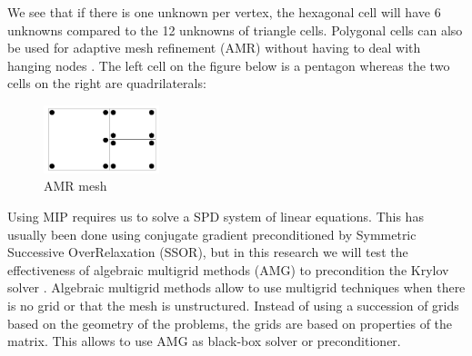 We see that if there is one unknown per vertex, the hexagonal cell will have 6
unknowns compared to the 12 unknowns of triangle cells. Polygonal cells can
also be used for adaptive mesh refinement (AMR) without having to
deal with hanging nodes 
\cite{locally_hanging_nodes,arbitrary_hanging_nodes,dealII_hanging_nodes}. The 
left cell on the figure below is a pentagon whereas the two cells on the right 
are quadrilaterals:
\begin{figure}[H]
\centering
\includegraphics[width=0.3\textwidth]{./Introduction/amr}
\caption{AMR mesh}
\end{figure}
Using MIP requires us to solve a SPD system of linear equations. This has 
usually been done using conjugate gradient preconditioned by Symmetric
Successive OverRelaxation (SSOR), but in this research we will test the 
effectiveness of algebraic multigrid methods (AMG) to precondition the Krylov solver 
\cite{amg,amg_course}. Algebraic multigrid methods allow to use multigrid
techniques when there is no grid or that the mesh is unstructured. Instead of
using a succession of grids based on the geometry of the problems, the grids
are based on properties of the matrix. This allows to use AMG as black-box
solver or preconditioner.

